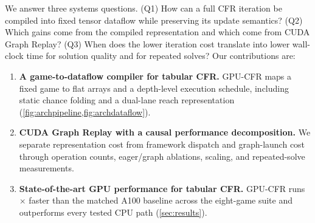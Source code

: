 We answer three systems questions. (Q1) How can a full CFR iteration be compiled into
fixed tensor dataflow while preserving its update semantics? (Q2) Which gains come
from the compiled representation and which come from CUDA Graph Replay? (Q3) When does
the lower iteration cost translate into lower wall-clock time for solution quality and
for repeated solves? Our contributions are:
\begin{enumerate}
    \item \textbf{A game-to-dataflow compiler for tabular CFR.} GPU-CFR maps a fixed
game to flat arrays and a depth-level execution schedule, including static chance
folding and a dual-lane reach representation
(\cref{fig:archpipeline,fig:archdataflow}).
    \item \textbf{CUDA Graph Replay with a causal performance decomposition.} We
separate representation cost from framework dispatch and graph-launch cost through
operation counts, eager/graph ablations, scaling, and repeated-solve measurements.
    \item \textbf{State-of-the-art GPU performance for tabular CFR.} GPU-CFR runs
\kimGraphRange$\times$ faster than the matched A100 baseline across the eight-game
suite and outperforms every tested CPU path (\cref{sec:results}).
\end{enumerate}
